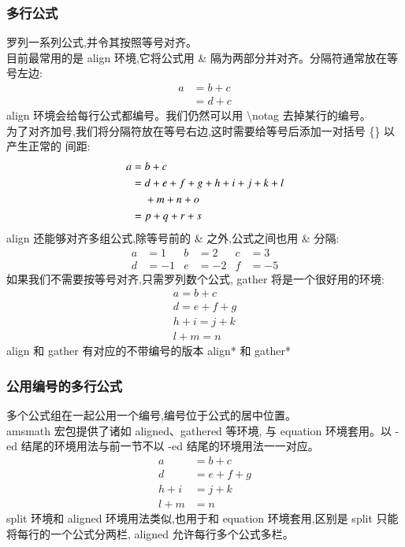 \documentclass[a4paper]{ctexart}
\begin{document}
    \subsubsection{多行公式}
    罗列一系列公式,并令其按照等号对齐。\\
    目前最常用的是 align 环境,它将公式用 \& 隔为两部分并对齐。分隔符通常放在等号左边:
    \begin{align}
        a & = b + c \\
          & = d + c
    \end{align}
    align 环境会给每行公式都编号。我们仍然可以用 \textbackslash notag 去掉某行的编号。\\
    为了对齐加号,我们将分隔符放在等号右边,这时需要给等号后添加一对括号 \{\} 以产生正常的 间距:
    \begin{align}
        a ={} & b + c   \\
          ={} & d + e + f + g + h + i + j + k + l \notag    \\
              & + m + n + o \\
          ={} & p + q + r + s   
    \end{align}
    align 还能够对齐多组公式,除等号前的 \& 之外,公式之间也用 \& 分隔:
    \begin{align}
        a & = 1     & b & = 2   & c & = 3   \\
        d & = - 1   & e & = - 2 & f & = - 5 
    \end{align}
    如果我们不需要按等号对齐,只需罗列数个公式, gather 将是一个很好用的环境:
    \begin{gather}
        a = b + c   \\
        d = e + f + g   \\
        h + i = j + k   \\
        l + m = n
    \end{gather}
    align 和 gather 有对应的不带编号的版本 align* 和 gather*
    \subsubsection{公用编号的多行公式}
    多个公式组在一起公用一个编号,编号位于公式的居中位置。\\
    amsmath 宏包提供了诸如 aligned、gathered 等环境,%
    与 equation 环境套用。以 -ed 结尾的环境用法与前一节不以 -ed 结尾的环境用法一一对应。
    \begin{equation}
        \begin{aligned}
            a & = b + c \\
            d & = e + f + g   \\
            h + i & = j + k   \\
            l + m & = n
        \end{aligned}
    \end{equation}
    split 环境和 aligned 环境用法类似,也用于和 equation 环境套用,区别是 split 只能 将每行的一个公式分两栏,
    aligned 允许每行多个公式多栏。
\end{document}
